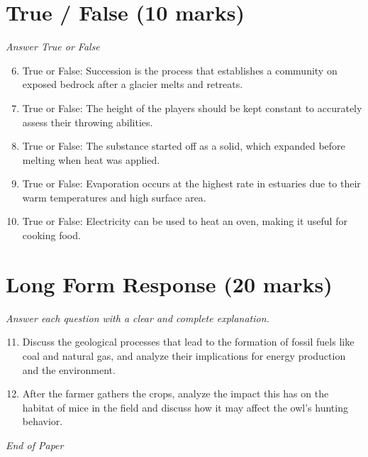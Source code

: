 \documentclass[12pt]{article}
\begin{document}
\section*{True / False (10 marks)}
\textit{Answer True or False}
\begin{enumerate}[label=\arabic*.]
\setcounter{enumi}{5}
\item True or False: Succession is the process that establishes a community on exposed bedrock after a glacier melts and retreats.
\item True or False: The height of the players should be kept constant to accurately assess their throwing abilities.
\item True or False: The substance started off as a solid, which expanded before melting when heat was applied.
\item True or False: Evaporation occurs at the highest rate in estuaries due to their warm temperatures and high surface area.
\item True or False: Electricity can be used to heat an oven, making it useful for cooking food.
\end{enumerate}

\section*{Long Form Response (20 marks)}
\textit{Answer each question with a clear and complete explanation.}
\begin{enumerate}[label=\arabic*.]
\setcounter{enumi}{10}
\item Discuss the geological processes that lead to the formation of fossil fuels like coal and natural gas, and analyze their implications for energy production and the environment.
\item After the farmer gathers the crops, analyze the impact this has on the habitat of mice in the field and discuss how it may affect the owl's hunting behavior.
\end{enumerate}

\vfill
\noindent\textit{End of Paper}
\end{document}
